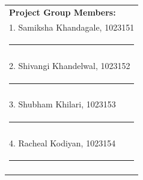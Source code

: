 \vspace{3cm}
\hfill%
\begin{tabular}[t]{l@{}}
\vspace{1cm}

{\textbf{Project Group Members:}} \\ 
\vspace{1cm}

1. Samiksha Khandagale, 1023151 \\
\noindent\rule{5cm}{0.10pt} \\
\\
\vspace{1cm}

2. Shivangi Khandelwal, 1023152 \\
\noindent\rule{5cm}{0.10pt} \\
\\
\vspace{1cm}

3. Shubham Khilari, 1023153 \\
 \noindent\rule{5cm}{0.10pt}
\\
\\
\vspace{1cm}

4. Racheal Kodiyan, 1023154 \\
 \noindent\rule{5cm}{0.10pt}
\\
\vspace{2cm}
\end{tabular}

